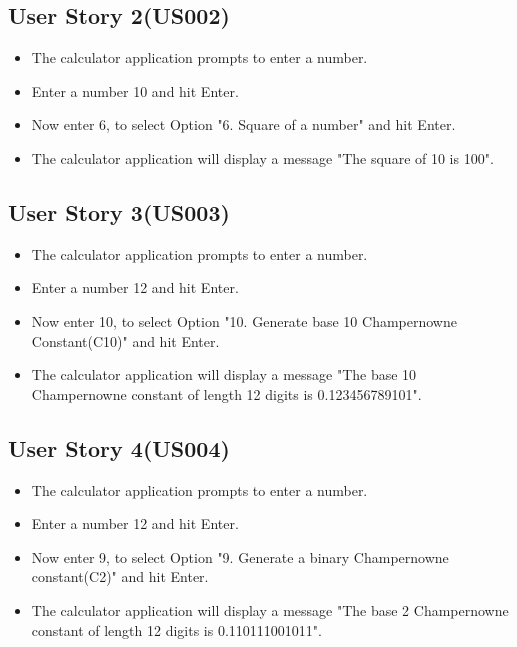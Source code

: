 \documentclass[12pt, a4paper]{report}
\begin{document}
\subsection{User Story 2(US002)}
\begin{itemize}
    \item The calculator application prompts to enter a number.
    \item Enter a number 10 and hit Enter.
    \item Now enter 6, to select Option "6. Square of a number" and hit Enter.
    \item The calculator application will display a message "The square of 10 is 100".
\end{itemize}

\subsection{User Story 3(US003)}
\begin{itemize}
    \item The calculator application prompts to enter a number.
    \item Enter a number 12 and hit Enter.
    \item Now enter 10, to select Option "10. Generate base 10 Champernowne Constant(C10)" and hit Enter.
    \item The calculator application will display a message "The base 10 Champernowne constant of length 12 digits is 0.123456789101".
\end{itemize}

\subsection{User Story 4(US004)}
\begin{itemize}
    \item The calculator application prompts to enter a number.
    \item Enter a number 12 and hit Enter.
    \item Now enter 9, to select Option "9. Generate a binary Champernowne constant(C2)" and hit Enter.
    \item The calculator application will display a message "The base 2 Champernowne constant of length 12 digits is 0.110111001011".
\end{itemize}
\end{document}
